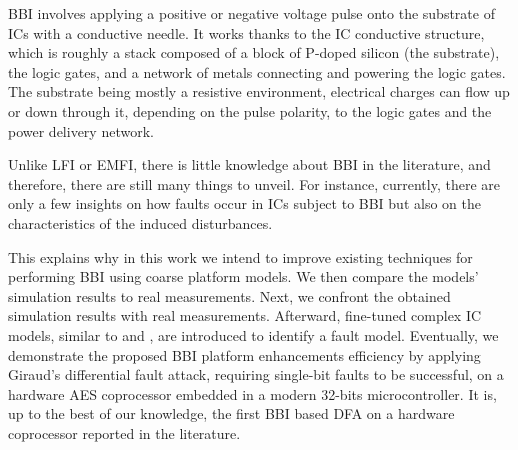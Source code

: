 \documentclass[10pt, conference, compsocconf]{IEEEtran}
\begin{document}
BBI involves applying a positive or negative voltage pulse onto the substrate of ICs with a conductive needle.
It works thanks to the IC conductive structure, which is roughly a stack composed of a block of P-doped silicon (the substrate), the logic gates, and a network of metals connecting and powering the logic gates.
The substrate being mostly a resistive environment, electrical charges can flow up or down through it, depending on the pulse polarity, to the logic gates and the power delivery network.

Unlike LFI or EMFI, there is little knowledge about BBI in the literature, and therefore, there are still many things to unveil.
For instance, currently, there are only a few insights on how faults occur in ICs subject to BBI but also on the characteristics of the induced disturbances.

This explains why in this work we intend to improve existing techniques for performing BBI using coarse platform models.
We then compare the models' simulation results to real measurements.
Next, we confront the obtained simulation results with real measurements.
Afterward, fine-tuned complex IC models, similar to \cite{mybbi1} and \cite{mybbi2}, are introduced to identify a fault model.
Eventually, we demonstrate the proposed BBI platform enhancements efficiency by applying Giraud's differential fault attack, requiring single-bit faults to be successful, on a hardware AES coprocessor embedded in a modern 32-bits microcontroller.
It is, up to the best of our knowledge, the first BBI based DFA on a hardware coprocessor reported in the literature.
\end{document}
